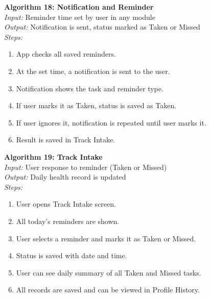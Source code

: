 \textbf{Algorithm 18: Notification and Reminder}\\
\textit{Input:} Reminder time set by user in any module\\
\textit{Output:} Notification is sent, status marked as Taken or Missed\\
\textit{Steps:}
\begin{enumerate}
    \item App checks all saved reminders.
    \item At the set time, a notification is sent to the user.
    \item Notification shows the task and reminder type.
    \item If user marks it as Taken, status is saved as Taken.
    \item If user ignores it, notification is repeated until user marks it.
    \item Result is saved in Track Intake.
\end{enumerate}

\textbf{Algorithm 19: Track Intake}\\
\textit{Input:} User response to reminder (Taken or Missed)\\
\textit{Output:} Daily health record is updated\\
\textit{Steps:}
\begin{enumerate}
    \item User opens Track Intake screen.
    \item All today's reminders are shown.
    \item User selects a reminder and marks it as Taken or Missed.
    \item Status is saved with date and time.
    \item User can see daily summary of all Taken and Missed tasks.
    \item All records are saved and can be viewed in Profile History.
\end{enumerate}

